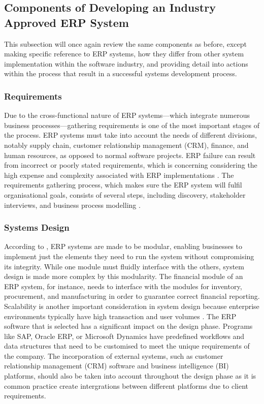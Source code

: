 \subsection{Components of Developing an Industry Approved ERP System}
\par{This subsection will once again review the same components as before, except making specific reference to ERP systems, how they differ from other system implementation within the software industry, and providing detail into actions within the process that result in a successful systems development process.}
\subsubsection{Requirements}
\par{Due to the cross-functional nature of ERP systems—which integrate numerous business processes—gathering requirements is one of the most important stages of the process. ERP systems must take into account the needs of different divisions, notably supply chain, customer relationship management (CRM), finance, and human resources, as opposed to normal software projects. ERP failure can result from incorrect or poorly stated requirements, which is concerning considering the high expense and complexity associated with ERP implementations \citep{monk2013concepts}. The requirements gathering process, which makes sure the ERP system will fulfil organisational goals, consists of several steps, including discovery, stakeholder interviews, and business process modelling \citep{esteves2001enterprise}. }
\subsubsection{Systems Design}
\par{According to \cite{monk2013concepts}, ERP systems are made to be modular, enabling businesses to implement just the elements they need to run the system without compromising its integrity. While one module must fluidly interface with the others, system design is made more complex by this modularity. The financial module of an ERP system, for instance, needs to interface with the modules for inventory, procurement, and manufacturing in order to guarantee correct financial reporting. Scalability is another important consideration in system design because enterprise environments typically have high transaction and user volumes \citep{o2000enterprise}. The ERP software that is selected has a significant impact on the design phase. Programs like SAP, Oracle ERP, or Microsoft Dynamics have predefined workflows and data structures that need to be customised to meet the unique requirements of the company. The incorporation of external systems, such as customer relationship management (CRM) software and business intelligence (BI) platforms, should also be taken into account throughout the design phase as it is common practice create intergrations between different platforms due to client requirements.}
